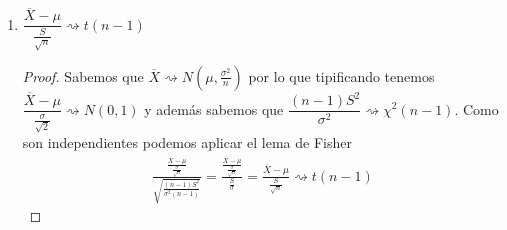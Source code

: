\begin{ejercicio}
\begin{enumerate}
        \item $\dfrac{\overline{X}-\mu}{\frac{S}{\sqrt{n}}} \rightsquigarrow t(n-1)$
        \begin{proof}
            Sabemos que $\overline{X} \rightsquigarrow N\left(\mu, \frac{\sigma^2}{n}\right)$ por lo que tipificando tenemos $\dfrac{\overline{X} - \mu}{\frac{\sigma}{\sqrt{2}}} \rightsquigarrow N(0,1)$ y además sabemos que $\dfrac{(n-1)S^2}{\sigma^2} \rightsquigarrow \chi^2(n-1)$. Como son independientes podemos aplicar el lema de Fisher
            \begin{gather*}
                \frac{\frac{\overline{X}-\mu}{\frac{\sigma}{\sqrt{n}}}}{\sqrt{\frac{(n-1)S^2}{\sigma^2(n-1)}}} = \frac{\frac{\overline{X}-\mu}{\frac{\sigma}{\sqrt{n}}}}{\frac{S}{\sigma}} = \frac{\overline{X}-\mu}{\frac{S}{\sqrt{n}}} \rightsquigarrow t(n-1)
            \end{gather*}
        \end{proof}
    \end{enumerate}
\end{ejercicio}